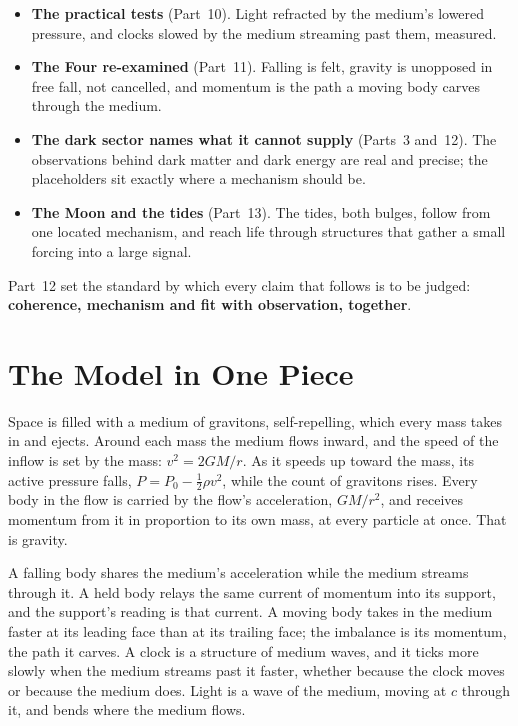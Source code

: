 \documentclass[11pt,a4paper]{article}
\begin{document}
\begin{itemize}
\item \textbf{The practical tests} (Part~10). Light refracted by the medium's lowered pressure, and clocks slowed by the medium streaming past them, measured.
\item \textbf{The Four re-examined} (Part~11). Falling is felt, gravity is unopposed in free fall, not cancelled, and momentum is the path a moving body carves through the medium.
\item \textbf{The dark sector names what it cannot supply} (Parts~3 and~12). The observations behind dark matter and dark energy are real and precise; the placeholders sit exactly where a mechanism should be.
\item \textbf{The Moon and the tides} (Part~13). The tides, both bulges, follow from one located mechanism, and reach life through structures that gather a small forcing into a large signal.
\end{itemize}
Part~12 set the standard by which every claim that follows is to be judged: \textbf{coherence, mechanism and fit with observation, together}.

\section{The Model in One Piece}
\label{sec:model}

\begin{hypbar}
Space is filled with a medium of gravitons, self-repelling, which every mass takes in and ejects. Around each mass the medium flows inward, and the speed of the inflow is set by the mass: $v^2 = 2GM/r$. As it speeds up toward the mass, its active pressure falls, $P = P_0 - \tfrac12\rho v^2$, while the count of gravitons rises. Every body in the flow is carried by the flow's acceleration, $GM/r^2$, and receives momentum from it in proportion to its own mass, at every particle at once. That is gravity.

A falling body shares the medium's acceleration while the medium streams through it. A held body relays the same current of momentum into its support, and the support's reading is that current. A moving body takes in the medium faster at its leading face than at its trailing face; the imbalance is its momentum, the path it carves. A clock is a structure of medium waves, and it ticks more slowly when the medium streams past it faster, whether because the clock moves or because the medium does. Light is a wave of the medium, moving at $c$ through it, and bends where the medium flows.
\end{hypbar}
\end{document}
